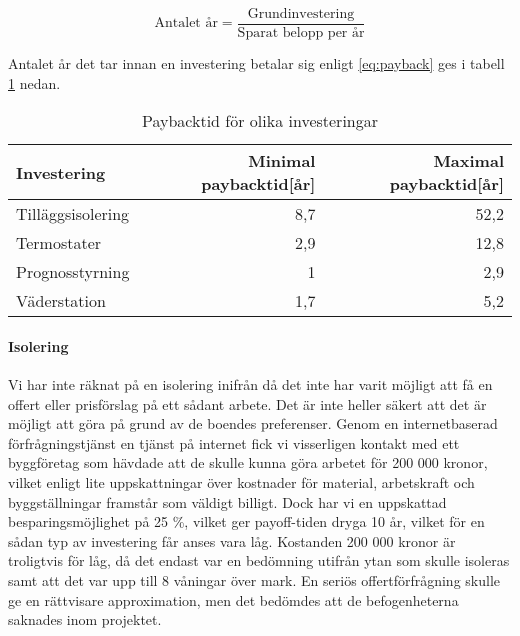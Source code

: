 \begin{equation} \label{eq:payback}
\text{Antalet år}=\frac{\text{Grundinvestering}}{\text{Sparat belopp per år}}
\end{equation}

Antalet år det tar innan en investering betalar sig enligt \eqref{eq:payback} ges i tabell \ref{tbl:payback} nedan.

\begin{table}[hbtp]
\centering
\caption{Paybacktid för olika investeringar}
\label{tbl:payback}

\begin{tabular}
{|l|r|r|}
\hline
\textbf{Investering} & \textbf{Minimal paybacktid[år]} &{\textbf{Maximal paybacktid[år]}} \\
\hline
Tilläggsisolering & 8,7 & 52,2 \\
\hline
Termostater & 2,9 & 12,8 \\
\hline
Prognosstyrning &  1 & 2,9 \\ 
\hline
Väderstation & 1,7 & 5,2 \\
\hline

\end{tabular}
\end{table}

\paragraph{Isolering}
Vi har inte räknat på en isolering inifrån då det inte har varit möjligt att få en offert eller prisförslag på ett sådant arbete. Det är inte heller säkert att det är möjligt att göra på grund av de boendes preferenser. Genom en internetbaserad förfrågningstjänst en tjänst på internet fick vi visserligen kontakt med ett byggföretag som hävdade att de skulle kunna göra arbetet för 200 000 kronor, vilket enligt lite uppskattningar över kostnader för material, arbetskraft och byggställningar framstår som väldigt billigt. Dock har vi en uppskattad besparingsmöjlighet på 25 \%, vilket ger payoff-tiden dryga 10 år, vilket för en sådan typ av investering får anses vara låg. Kostanden 200 000 kronor är troligtvis för låg, då det endast var en bedömning utifrån ytan som skulle isoleras samt att det var upp till 8 våningar över mark. En seriös offertförfrågning skulle ge en rättvisare approximation, men det bedömdes att de befogenheterna saknades inom projektet.

